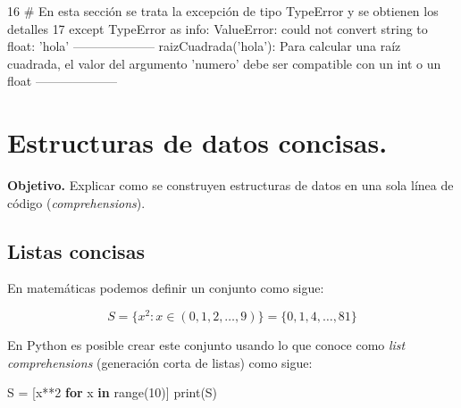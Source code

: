 \documentclass[
  spanish,
  letterpaper,
]{scrbook}
\newenvironment{Shaded}{\begin{snugshade}}{\end{snugshade}}
\newcommand{\BuiltInTok}[1]{\textcolor[rgb]{0.00,0.23,0.31}{#1}}
\newcommand{\ControlFlowTok}[1]{\textcolor[rgb]{0.00,0.23,0.31}{\textbf{#1}}}
\newcommand{\DecValTok}[1]{\textcolor[rgb]{0.68,0.00,0.00}{#1}}
\newcommand{\KeywordTok}[1]{\textcolor[rgb]{0.00,0.23,0.31}{\textbf{#1}}}
\newcommand{\NormalTok}[1]{\textcolor[rgb]{0.00,0.23,0.31}{#1}}
\newcommand{\OperatorTok}[1]{\textcolor[rgb]{0.37,0.37,0.37}{#1}}
\theoremstyle{definition}
\theoremstyle{remark}
\begin{document}
\begin{Highlighting}
\textcolor{QuartoInternalColor2}{}\textcolor{QuartoInternalColor4}{     16}\textcolor{QuartoInternalColor2}{ }\textcolor{QuartoInternalColor9}{# En esta sección se trata la excepción de tipo TypeError y se obtienen los detalles  }\textcolor{QuartoInternalColor2}{}
\textcolor{QuartoInternalColor2}{}\textcolor{QuartoInternalColor4}{     17}\textcolor{QuartoInternalColor2}{ }\textcolor{QuartoInternalColor5}{except}\textcolor{QuartoInternalColor2}{ }\textcolor{QuartoInternalColor12}{TypeError}\textcolor{QuartoInternalColor2}{ }\textcolor{QuartoInternalColor5}{as}\textcolor{QuartoInternalColor2}{ info:}
\textcolor{QuartoInternalColor2}{}\textcolor{QuartoInternalColor1}{ValueError}\textcolor{QuartoInternalColor2}{: could not convert string to float: 'hola'}
\textcolor{QuartoInternalColor2}{--------------------}
\textcolor{QuartoInternalColor2}{raizCuadrada('hola'): Para calcular una raíz cuadrada, el valor del argumento 'numero' debe ser compatible con un int o un float}
\textcolor{QuartoInternalColor2}{--------------------}
\end{Highlighting}

\chapter{Estructuras de datos concisas.}\label{sec-r-comprehensions}

\textbf{Objetivo.} Explicar como se construyen estructuras de datos en
una sola línea de código (\emph{comprehensions}).

\section{Listas concisas}\label{listas-concisas}

En matemáticas podemos definir un conjunto como sigue:

\[S = \{x^2 : x \in (0, 1, 2, \dots, 9)\} = \{0, 1, 4, \dots, 81\}\]

En Python es posible crear este conjunto usando lo que conoce como
\emph{list comprehensions} (generación corta de listas) como sigue:

\begin{Shaded}
\begin{Highlighting}[]
\NormalTok{S }\OperatorTok{=}\NormalTok{ [x}\OperatorTok{**}\DecValTok{2} \ControlFlowTok{for}\NormalTok{ x }\KeywordTok{in} \BuiltInTok{range}\NormalTok{(}\DecValTok{10}\NormalTok{)]}
\BuiltInTok{print}\NormalTok{(S)}
\end{Highlighting}
\end{Shaded}
\end{document}

